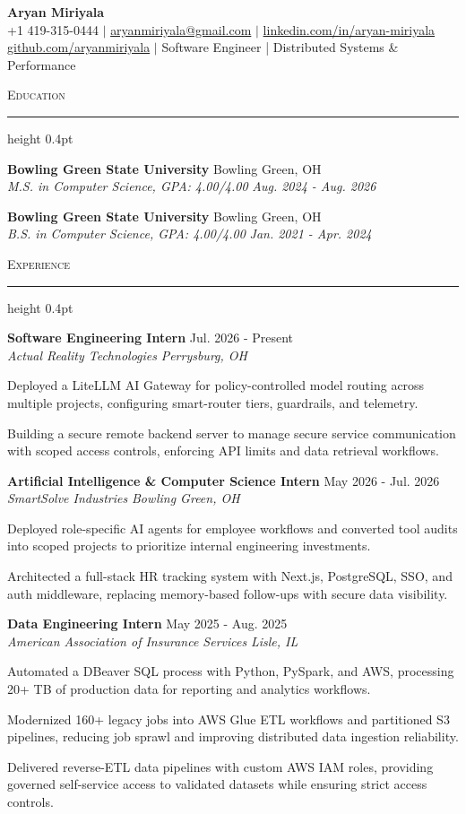 \documentclass[letterpaper,11pt]{article}
\newcommand{\resumesection}[1]{%
  \par\vspace{2pt}%
  {\large\scshape #1}\par\vspace{2pt}%
  \hrule height 0.4pt\vspace{2pt}%
}
\newcommand{\resumeSubheading}[4]{
  \textbf{#1} \hfill #2\\
  \textit{#3} \hfill \textit{#4}
}
\begin{document}
\begin{center}
  {\LARGE \textbf{Aryan Miriyala}}\\[2pt]
  \small
  +1 419-315-0444 $|$ \href{mailto:aryanmiriyala@gmail.com}{aryanmiriyala@gmail.com} $|$ \href{https://www.linkedin.com/in/aryan-miriyala-7788a21b6/}{linkedin.com/in/aryan-miriyala}\\
  \href{https://github.com/aryanmiriyala}{github.com/aryanmiriyala} $|$ Software Engineer | Distributed Systems \& Performance
\end{center}\vspace{-6pt}

\resumesection{Education}
\resumeSubheading
{Bowling Green State University}{Bowling Green, OH}
{M.S. in Computer Science, GPA: 4.00/4.00}{Aug. 2024 - Aug. 2026}

\resumeSubheading
{Bowling Green State University}{Bowling Green, OH}
{B.S. in Computer Science, GPA: 4.00/4.00}{Jan. 2021 - Apr. 2024}

\resumesection{Experience}
\resumeSubheading
{Software Engineering Intern}{Jul. 2026 - Present}
{Actual Reality Technologies}{Perrysburg, OH}
\begin{tightitemize}
  \item Deployed a LiteLLM AI Gateway for policy-controlled model routing across multiple projects, configuring smart-router tiers, guardrails, and telemetry.
  \item Building a secure remote backend server to manage secure service communication with scoped access controls, enforcing API limits and data retrieval workflows.
\end{tightitemize}

\resumeSubheading
{Artificial Intelligence \& Computer Science Intern}{May 2026 - Jul. 2026}
{SmartSolve Industries}{Bowling Green, OH}
\begin{tightitemize}
  \item Deployed role-specific AI agents for employee workflows and converted tool audits into scoped projects to prioritize internal engineering investments.
  \item Architected a full-stack HR tracking system with Next.js, PostgreSQL, SSO, and auth middleware, replacing memory-based follow-ups with secure data visibility.
\end{tightitemize}

\resumeSubheading
{Data Engineering Intern}{May 2025 - Aug. 2025}
{American Association of Insurance Services}{Lisle, IL}
\begin{tightitemize}
  \item Automated a DBeaver SQL process with Python, PySpark, and AWS, processing 20+ TB of production data for reporting and analytics workflows.
  \item Modernized 160+ legacy jobs into AWS Glue ETL workflows and partitioned S3 pipelines, reducing job sprawl and improving distributed data ingestion reliability.
  \item Delivered reverse-ETL data pipelines with custom AWS IAM roles, providing governed self-service access to validated datasets while ensuring strict access controls.
\end{tightitemize}
\end{document}
